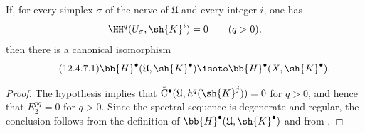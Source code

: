 \begin{corollary}[12.4.7]
\label{0.12.4.7}
If, for every simplex $\sigma$ of the nerve of $\mathfrak{U}$ and
every integer $i$, one has
\[
  \HH^q(U_\sigma,\sh{K}^i)=0
  \qquad(q>0),
\]
then there is a canonical isomorphism
\begin{equation}
\label{0.12.4.7.1}
\tag{12.4.7.1}
  \bb{H}^\bullet(\mathfrak{U},\sh{K}^\bullet)
  \isoto
  \bb{H}^\bullet(X,\sh{K}^\bullet).
\end{equation}
\end{corollary}

\begin{proof}
The hypothesis implies that
$\check{\mathrm{C}}^\bullet
(\mathfrak{U},h^q(\sh{K}^j))=0$ for $q>0$, and hence that
$E_2^{pq}=0$ for $q>0$.
Since the spectral sequence  is degenerate and
regular, the conclusion follows from the definition
 of
$\bb{H}^\bullet(\mathfrak{U},\sh{K}^\bullet)$ and from
.
\end{proof}

